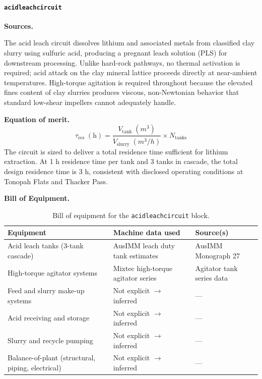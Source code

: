 \documentclass{article}
\renewcommand\_{\textunderscore\allowbreak}
\begin{document}
\clearpage
\paragraph{\texttt{acid\_leach\_circuit}}\label{app:04-methods-blockdefs-acidleach}\leavevmode\par

\medskip
\noindent\textbf{Sources.}\quad

\citet{iyerLifecycleAnalysisLithium2024, royLithiumClayAssessing2024, khakmardanLifeCycleAssessment2024, mousavinezhadNextLithiumBoom2025, mousavinezhadSustainableLithiumProduction2025, wesselkaemperOptimizationProcessingCosts2025, sgscanadaincSK1300Technical2024, riordanTonopahLithiumClaims2023, fluorenterprisesRhyoliteRidgeLithiumBoron2022}

The acid leach circuit dissolves lithium and associated metals from classified clay slurry using sulfuric acid, producing a pregnant leach solution (PLS) for downstream processing. Unlike hard-rock pathways, no thermal activation is required; acid attack on the clay mineral lattice proceeds directly at near-ambient temperatures. High-torque agitation is required throughout because the elevated fines content of clay slurries produces viscous, non-Newtonian behavior that standard low-shear impellers cannot adequately handle.

\medskip
\noindent\textbf{Equation of merit.}\quad
\[
    \tau_\text{res}\;(\text{h}) = \frac{V_\text{tank}\;(\si{m^3})}{\dot{V}_\text{slurry}\;(\si{m^3/h})} \times N_\text{tanks}
\]
The circuit is sized to deliver a total residence time sufficient for lithium extraction. At 1 h residence time per tank and 3 tanks in cascade, the total design residence time is 3 h, consistent with disclosed operating conditions at Tonopah Flats and Thacker Pass.

\medskip
\noindent\textbf{Bill of Equipment.}\quad

\begin{table}[h!]
\caption{Bill of equipment for the \texttt{acid\_leach\_circuit} block.}
\centering
\begin{tabular}{>{\raggedright\arraybackslash}p{5.2cm}
                >{\raggedright\arraybackslash}p{4cm}
                >{\raggedright\arraybackslash}p{4.5cm}}
\toprule
\textbf{Equipment} & \textbf{Machine data used} & \textbf{Source(s)} \\
\midrule
Acid leach tanks (3-tank cascade) & AusIMM leach duty tank estimates & AusIMM Monograph 27 \\
High-torque agitator systems & Mixtec high-torque agitator series & Agitator tank series data \\
Feed and slurry make-up systems & Not explicit $\rightarrow$ inferred & --- \\
Acid receiving and storage & Not explicit $\rightarrow$ inferred & --- \\
Slurry and recycle pumping & Not explicit $\rightarrow$ inferred & --- \\
Balance-of-plant (structural, piping, electrical) & Not explicit $\rightarrow$ inferred & --- \\
\bottomrule
\end{tabular}
\end{table}
\end{document}
